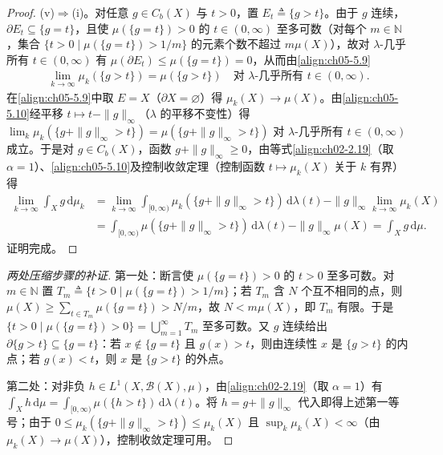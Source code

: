 \documentclass[../../main.tex]{subfiles}%
\begin{document}
\begin{proof}
(v)$\Rightarrow$(i)。对任意 $g\in C_b(X)$ 与 $t>0$，置 $E_t\triangleq \{g>t\}$。由于 $g$ 连续，$\partial E_t\subseteq\{g=t\}$，且使 $\mu(\{g=t\})>0$ 的 $t\in(0,\infty)$ 至多可数（对每个 $m\in\mathbb{N}$，集合 $\{t>0\mid\mu(\{g=t\})>1/m\}$ 的元素个数不超过 $m\mu(X)$），故对 $\lambda$-几乎所有 $t\in(0,\infty)$ 有 $\mu(\partial E_t)\leqslant\mu(\{g=t\})=0$，从而由\eqref{align:ch05-5.9}
\begin{align}
\lim_{k\to\infty}\mu_k(\{g>t\})=\mu(\{g>t\})
\quad\text{对 }\lambda\text{-几乎所有 }t\in(0,\infty).\label{align:ch05-5.10}
\end{align}
在\eqref{align:ch05-5.9}中取 $E=X$（$\partial X=\varnothing$）得 $\mu_k(X)\to\mu(X)$。由\eqref{align:ch05-5.10}经平移 $t\mapsto t-\|g\|_\infty$（$\lambda$ 的平移不变性）得 $\lim_k\mu_k(\{g+\|g\|_\infty>t\})=\mu(\{g+\|g\|_\infty>t\})$ 对 $\lambda$-几乎所有 $t\in(0,\infty)$ 成立。于是对 $g\in C_b(X)$，函数 $g+\|g\|_\infty\geqslant0$，由等式\eqref{align:ch02-2.19}（取 $\alpha=1$）、\eqref{align:ch05-5.10}及控制收敛定理（控制函数 $t\mapsto\mu_k(X)$ 关于 $k$ 有界）得
\begin{align*}
\lim_{k\to\infty}\int_X g\,\mathrm{d}\mu_k
&=\lim_{k\to\infty}\int_{[0,\infty)}\mu_k(\{g+\|g\|_\infty>t\})\,\mathrm{d}\lambda(t)-\|g\|_\infty\lim_{k\to\infty}\mu_k(X)\\
&=\int_{[0,\infty)}\mu(\{g+\|g\|_\infty>t\})\,\mathrm{d}\lambda(t)-\|g\|_\infty\mu(X)
=\int_X g\,\mathrm{d}\mu.
\end{align*}
证明完成。
\end{proof}

\begin{proof}[两处压缩步骤的补证]
第一处：断言使 $\mu(\{g=t\})>0$ 的 $t>0$ 至多可数。对 $m\in\mathbb{N}$ 置 $T_m\triangleq\{t>0\mid\mu(\{g=t\})>1/m\}$；若 $T_m$ 含 $N$ 个互不相同的点，则 $\mu(X)\geqslant\sum_{t\in T_m}\mu(\{g=t\})>N/m$，故 $N<m\mu(X)$，即 $T_m$ 有限。于是 $\{t>0\mid\mu(\{g=t\})>0\}=\bigcup_{m=1}^\infty T_m$ 至多可数。又 $g$ 连续给出 $\partial\{g>t\}\subseteq\{g=t\}$：若 $x\notin\{g=t\}$ 且 $g(x)>t$，则由连续性 $x$ 是 $\{g>t\}$ 的内点；若 $g(x)<t$，则 $x$ 是 $\{g>t\}$ 的外点。

第二处：对非负 $h\in L^1(X,\mathscr{B}(X),\mu)$，由\eqref{align:ch02-2.19}（取 $\alpha=1$）有 $\int_Xh\,\mathrm{d}\mu=\int_{[0,\infty)}\mu(\{h>t\})\,\mathrm{d}\lambda(t)$。将 $h=g+\|g\|_\infty$ 代入即得上述第一等号；由于 $0\leqslant\mu_k(\{g+\|g\|_\infty>t\})\leqslant\mu_k(X)$ 且 $\sup_k\mu_k(X)<\infty$（由 $\mu_k(X)\to\mu(X)$），控制收敛定理可用。
\end{proof}
\end{document}
